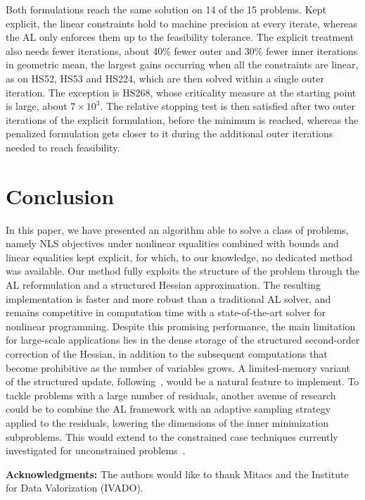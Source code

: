 \documentclass{article}
\numberwithin{equation}{section}
\theoremstyle{plain}
\begin{document}
Both formulations reach the same solution on 14 of the 15 problems. Kept explicit, the linear constraints hold to machine precision at every iterate, whereas the AL only enforces them up to the feasibility tolerance. The explicit treatment also needs fewer iterations, about 40\% fewer outer and 30\% fewer inner iterations in geometric mean, the largest gains occurring when all the constraints are linear, as on HS52, HS53 and HS224, which are then solved within a single outer iteration. The exception is HS268, whose criticality measure at the starting point is large, about $7\times10^3$. The relative stopping test is then satisfied after two outer iterations of the explicit formulation, before the minimum is reached, whereas the penalized formulation gets closer to it during the additional outer iterations needed to reach feasibility.

\section*{Conclusion}
In this paper, we have presented an algorithm able to solve a class of problems, namely NLS objectives under nonlinear equalities combined with bounds and linear equalities kept explicit, for which, to our knowledge, no dedicated method was available. Our method fully exploits the structure of the problem through the AL reformulation and a structured Hessian approximation. The resulting implementation is faster and more robust than a traditional AL solver, and remains competitive in computation time with a state-of-the-art solver for nonlinear programming. Despite this promising performance, the main limitation for large-scale applications lies in the dense storage of the structured second-order correction of the Hessian, in addition to the subsequent computations that become prohibitive as the number of variables grows. A limited-memory variant of the structured update, following~\cite{byrd-etal:1994}, would be a natural feature to implement. To tackle problems with a large number of residuals, another avenue of research could be to combine the AL framework with an adaptive sampling strategy applied to the residuals, lowering the dimensions of the inner minimization subproblems. This would extend to the constrained case techniques currently investigated for unconstrained problems~\cite{bellavia-etal:2026}.

\vspace{1em}\noindent\textbf{Acknowledgments:} The authors would like to thank Mitacs and the Institute for Data Valorization (IVADO).
\end{document}
